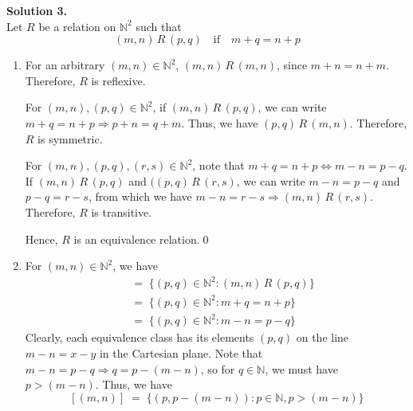 \documentclass[10pt]{article}
\begin{document}
        \textbf{Solution 3.}\\
        Let $R$ be a relation on $\mathbb{N}^2$ such that
        \[(m, n)\,R\,(p, q) \quad\text{if}\quad m + q = n + p\]
        \begin{enumerate}
                \item For an arbitrary $(m, n) \in \mathbb{N}^2$, $(m, n)\,R\,(m, n)$, since $m + n = n + m$. Therefore, $R$
                is reflexive.

                For $(m, n), (p, q) \in \mathbb{N}^2$, if $(m, n)\,R\,(p, q)$, we can write $m + q = n + p \Rightarrow p + n = q + m$.
                Thus, we have $(p, q)\,R\,(m, n)$. Therefore, $R$ is symmetric.

                For $(m, n), (p, q), (r, s) \in \mathbb{N}^2$, note that $m + q = n + p \Leftrightarrow m - n = p - q$.
                If $(m, n)\,R\,(p, q)$ and $((p, q)\,R\,(r, s)$, we can write $m - n = p - q$ and $p - q = r - s$, from which we have
                $m - n = r - s \Rightarrow (m, n)\,R\,(r, s)$. Therefore, $R$ is transitive.

                Hence, $R$ is an equivalence relation.\qed

                \item For $(m, n) \in \mathbb{N}^2$, we have
                \begin{align*}
                [(m, n)] \;&=\; \{(p, q) \in \mathbb{N}^2 : (m, n)\,R\,(p, q)\} \\
                        \;&=\; \{(p, q) \in \mathbb{N}^2 : m + q = n + p\} \\
                        \;&=\; \{(p, q) \in \mathbb{N}^2 : m - n = p - q\}
                \end{align*}
                Clearly, each equivalence class has its elements $(p, q)$ on the line $m - n = x - y$ in the Cartesian plane.
                Note that $m - n = p - q \Rightarrow q = p - (m - n)$, so for $q \in \mathbb{N}$, we must have $p > (m - n)$.
                Thus, we have
                \[
                        [(m, n)] \;=\; \{(p, p - (m - n)): p \in \mathbb{N}, p > (m - n)\}
                \]\\

                \begin{center}
\end{center}
\end{enumerate}
\end{document}
